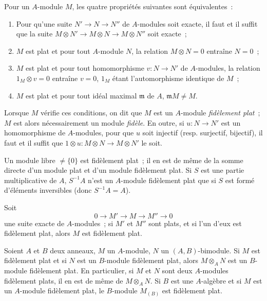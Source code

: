\begin{env}[6.4.1]
\label{0.6.4.1-fr}
Pour un $A$-module $M$, les quatre propriétés suivantes sont équivalentes~:
\begin{enumerate}
  \item[$a)$] Pour qu'une suite $N'\to N\to N''$ de $A$-modules soit exacte,
    il faut et il suffit que la suite
    $M\otimes N'\to M\otimes N\to M\otimes N''$ soit exacte~;
  \item[$b)$] $M$ est plat et pour tout $A$-module $N$, la relation
    $M\otimes N=0$ entraîne $N=0$~;
  \item[$c)$] $M$ est plat et pour tout homomorphisme $v:N\to N'$ de
    $A$-modules, la relation $1_M\otimes v=0$ entraîne $v=0$, $1_M$ étant
    l'automorphisme identique de $M$~;
  \item[$d)$] $M$ est plat et pour tout idéal maximal $\mathfrak{m}$ de
    $A$, $\mathfrak{m}M\neq M$.
\end{enumerate}

Lorsque $M$ vérifie ces conditions, on dit que $M$ est un $A$-module
\emph{fidèlement plat}~; $M$ est alors nécessairement un module
\emph{fidèle}. En outre, si $u:N\to N'$ est un homomorphisme de $A$-modules,
pour que $u$ soit injectif (resp. surjectif, bijectif), il faut et il suffit
que $1\otimes u:M\otimes N\to M\otimes N'$ le soit.
\end{env}


\begin{env}[6.4.2]
\label{0.6.4.2-fr}
Un module libre $\neq\{0\}$ est fidèlement plat~; il en est de même de la
somme directe d'un module plat et d'un module fidèlement plat. Si $S$ est
une partie multiplicative de $A$, $S^{-1}A$ n'est un $A$-module fidèlement
plat que si $S$ est formé d'éléments inversibles (donc $S^{-1}A=A$).
\end{env}

\begin{env}[6.4.3]
\label{0.6.4.3-fr}
Soit
\[
  0\longrightarrow M'\longrightarrow M\longrightarrow M''\longrightarrow 0
\]
une suite exacte de $A$-modules~; si $M'$ et $M''$ sont plats, et si l'un
d'eux est fidèlement plat, alors $M$ est fidèlement plat.
\end{env}

\begin{env}[6.4.4]
\label{0.6.4.4-fr}
Soient $A$ et $B$ deux anneaux, $M$ un $A$-module, $N$ un
$(A,B)$-bimodule. Si $M$ est fidèlement plat et si $N$ est un $B$-module
fidèlement plat, alors $M\otimes_A N$ est un $B$-module fidèlement plat. En
particulier, si $M$ et $N$ sont deux $A$-modules fidèlement plats, il en est
de même de $M\otimes_A N$. Si $B$ est une $A$-algèbre et si $M$ est un
$A$-module fidèlement plat, le $B$-module $M_{(B)}$ est fidèlement plat.
\end{env}

